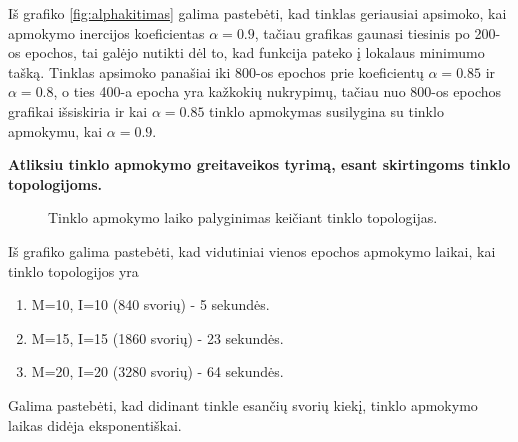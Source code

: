 Iš grafiko \ref{fig:alphakitimas} galima pastebėti, kad tinklas geriausiai apsimoko, kai apmokymo inercijos koeficientas $\alpha=0.9$, tačiau grafikas gaunasi tiesinis po 200-os epochos, tai galėjo nutikti dėl to, kad funkcija pateko į lokalaus minimumo tašką. Tinklas apsimoko panašiai iki 800-os epochos prie koeficientų $\alpha=0.85$ ir $\alpha=0.8$, o ties 400-a epocha yra kažkokių nukrypimų, tačiau nuo 800-os epochos grafikai išsiskiria ir kai $\alpha=0.85$ tinklo apmokymas susilygina su tinklo apmokymu, kai $\alpha=0.9$.

\textbf{Atliksiu tinklo apmokymo greitaveikos tyrimą, esant skirtingoms tinklo topologijoms.}

\begin{figure}[h!]
  \centering
{}
\caption{Tinklo apmokymo laiko palyginimas keičiant tinklo topologijas.}
\label{fig:laikograf}
\end{figure}

Iš grafiko galima pastebėti, kad vidutiniai vienos epochos apmokymo laikai, kai tinklo topologijos yra
\begin{enumerate}
  \item M=10, I=10 (840 svorių) - 5 sekundės.
  \item M=15, I=15 (1860 svorių) - 23 sekundės.
  \item M=20, I=20 (3280 svorių) - 64 sekundės.
\end{enumerate}
Galima pastebėti, kad didinant tinkle esančių svorių kiekį, tinklo apmokymo laikas didėja eksponentiškai.
